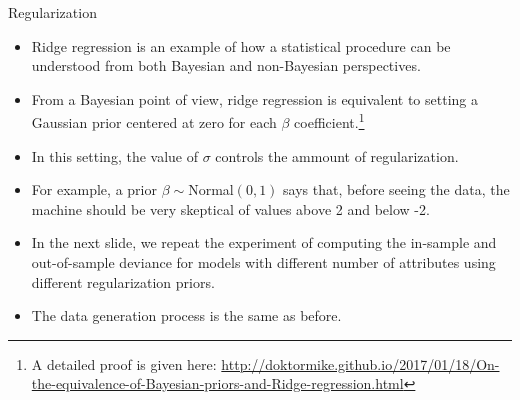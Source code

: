 \documentclass[handout]{beamer}
\begin{document}
\begin{frame}{Regularization}
\scriptsize{

\begin{itemize}

\item Ridge regression is an example of how a statistical procedure can be understood from both Bayesian and non-Bayesian perspectives.

\item From a Bayesian point of view, ridge regression is equivalent to setting a Gaussian prior centered at zero for each $\beta$ coefficient.\footnote{A detailed proof is given here: \url{http://doktormike.github.io/2017/01/18/On-the-equivalence-of-Bayesian-priors-and-Ridge-regression.html}}

\item In this setting, the value of $\sigma$ controls the ammount of regularization.

\item For example, a prior $\beta \sim $Normal$(0, 1)$ says that, before seeing the data, the machine should be very skeptical of values above 2 and below -2.

\item In the next slide, we repeat the experiment of computing  the in-sample and out-of-sample deviance for models with different number of attributes using different regularization priors.

\item The data generation process is the same as before.

\end{itemize}


} 
\end{frame}
\end{document}
